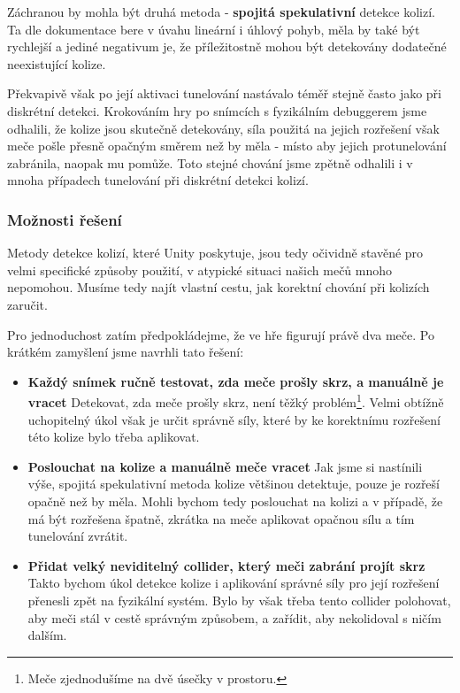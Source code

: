 \bigbreak

Záchranou by mohla být druhá metoda - \textbf{spojitá spekulativní} detekce kolizí. Ta dle dokumentace bere v úvahu lineární i úhlový pohyb, měla by také být rychlejší a jediné negativum je, že příležitostně mohou být detekovány dodatečné neexistující kolize. 

Překvapivě však po její aktivaci tunelování nastávalo téměř stejně často jako při diskrétní detekci. Krokováním hry po snímcích s fyzikálním debuggerem jsme odhalili, že kolize jsou skutečně detekovány, síla použitá na jejich rozřešení však meče pošle přesně opačným směrem než by měla - místo aby jejich protunelování zabránila, naopak mu pomůže. Toto stejné chování jsme zpětně odhalili i v mnoha případech tunelování při diskrétní detekci kolizí.


\subsubsection*{Možnosti řešení}

Metody detekce kolizí, které Unity poskytuje, jsou tedy očividně stavěné pro velmi specifické způsoby použití, v atypické situaci našich mečů mnoho nepomohou. Musíme tedy najít vlastní cestu, jak korektní chování při kolizích zaručit. 

Pro jednoduchost zatím předpokládejme, že ve hře figurují právě dva meče. Po krátkém zamyšlení jsme navrhli tato řešení:
\begin{itemize}
  \item \textbf{Každý snímek ručně testovat, zda meče prošly skrz, a manuálně je vracet}\linebreak
    Detekovat, zda meče prošly skrz, není těžký problém\footnote{Meče zjednodušíme na dvě úsečky v prostoru.}. Velmi obtížně uchopitelný úkol však je určit správně síly, které by ke korektnímu rozřešení této kolize bylo třeba aplikovat.
  \item \textbf{Poslouchat na kolize a manuálně meče vracet}\linebreak
    Jak jsme si nastínili výše, spojitá spekulativní metoda kolize většinou detektuje, pouze je rozřeší opačně než by měla. Mohli bychom tedy poslouchat na kolizi a v případě, že má být rozřešena špatně, zkrátka na meče aplikovat opačnou sílu a tím tunelování zvrátit.
  \item \textbf{Přidat velký neviditelný collider, který meči zabrání projít skrz}\linebreak 
    Takto bychom úkol detekce kolize i aplikování správné síly pro její rozřešení přenesli zpět na fyzikální systém. Bylo by však třeba tento collider polohovat, aby meči stál v cestě správným způsobem, a zařídit, aby nekolidoval s ničím dalším.  
\end{itemize}

